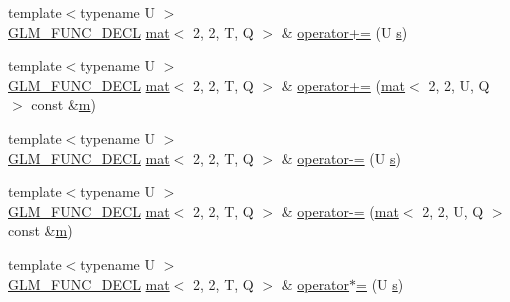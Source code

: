 \begin{DoxyCompactItemize}
\item 
{\footnotesize template$<$typename U $>$ }\\\mbox{\hyperlink{setup_8hpp_ab2d052de21a70539923e9bcbf6e83a51}{G\+L\+M\+\_\+\+F\+U\+N\+C\+\_\+\+D\+E\+CL}} \mbox{\hyperlink{structglm_1_1mat}{mat}}$<$ 2, 2, T, Q $>$ \& \mbox{\hyperlink{structglm_1_1mat_3_012_00_012_00_01_t_00_01_q_01_4_acb56f312f0c6017e051b447d4bdaf2e1}{operator+=}} (U \mbox{\hyperlink{_s_d_l__opengl_8h_a4af680a6c683f88ed67b76f207f2e6e4}{s}})
\item 
{\footnotesize template$<$typename U $>$ }\\\mbox{\hyperlink{setup_8hpp_ab2d052de21a70539923e9bcbf6e83a51}{G\+L\+M\+\_\+\+F\+U\+N\+C\+\_\+\+D\+E\+CL}} \mbox{\hyperlink{structglm_1_1mat}{mat}}$<$ 2, 2, T, Q $>$ \& \mbox{\hyperlink{structglm_1_1mat_3_012_00_012_00_01_t_00_01_q_01_4_a790cb47974031acf26e1f76c1453da8b}{operator+=}} (\mbox{\hyperlink{structglm_1_1mat}{mat}}$<$ 2, 2, U, Q $>$ const \&\mbox{\hyperlink{_s_d_l__opengl__glext_8h_af593500c283bf1a787a6f947f503a5c2}{m}})
\item 
{\footnotesize template$<$typename U $>$ }\\\mbox{\hyperlink{setup_8hpp_ab2d052de21a70539923e9bcbf6e83a51}{G\+L\+M\+\_\+\+F\+U\+N\+C\+\_\+\+D\+E\+CL}} \mbox{\hyperlink{structglm_1_1mat}{mat}}$<$ 2, 2, T, Q $>$ \& \mbox{\hyperlink{structglm_1_1mat_3_012_00_012_00_01_t_00_01_q_01_4_aecdeb6c1dc9896a5e3245fbdf4cd55de}{operator-\/=}} (U \mbox{\hyperlink{_s_d_l__opengl_8h_a4af680a6c683f88ed67b76f207f2e6e4}{s}})
\item 
{\footnotesize template$<$typename U $>$ }\\\mbox{\hyperlink{setup_8hpp_ab2d052de21a70539923e9bcbf6e83a51}{G\+L\+M\+\_\+\+F\+U\+N\+C\+\_\+\+D\+E\+CL}} \mbox{\hyperlink{structglm_1_1mat}{mat}}$<$ 2, 2, T, Q $>$ \& \mbox{\hyperlink{structglm_1_1mat_3_012_00_012_00_01_t_00_01_q_01_4_af18719180a65a0bedb63d5f4714ceda4}{operator-\/=}} (\mbox{\hyperlink{structglm_1_1mat}{mat}}$<$ 2, 2, U, Q $>$ const \&\mbox{\hyperlink{_s_d_l__opengl__glext_8h_af593500c283bf1a787a6f947f503a5c2}{m}})
\item 
{\footnotesize template$<$typename U $>$ }\\\mbox{\hyperlink{setup_8hpp_ab2d052de21a70539923e9bcbf6e83a51}{G\+L\+M\+\_\+\+F\+U\+N\+C\+\_\+\+D\+E\+CL}} \mbox{\hyperlink{structglm_1_1mat}{mat}}$<$ 2, 2, T, Q $>$ \& \mbox{\hyperlink{structglm_1_1mat_3_012_00_012_00_01_t_00_01_q_01_4_a1e8b90af651add45504f00f373c747d0}{operator$\ast$=}} (U \mbox{\hyperlink{_s_d_l__opengl_8h_a4af680a6c683f88ed67b76f207f2e6e4}{s}})

\end{DoxyCompactItemize}
